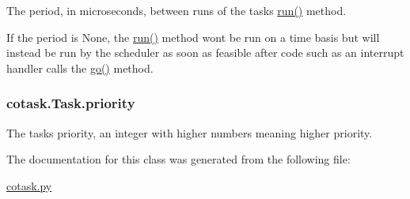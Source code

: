 The period, in microseconds, between runs of the task\textquotesingle{}s {\ttfamily \hyperlink{print__task_8py_abe2a60b9d48d38a4c9ec85bd891aafca}{run()}} method. 

If the period is {\ttfamily None}, the {\ttfamily \hyperlink{print__task_8py_abe2a60b9d48d38a4c9ec85bd891aafca}{run()}} method won\textquotesingle{}t be run on a time basis but will instead be run by the scheduler as soon as feasible after code such as an interrupt handler calls the {\ttfamily \hyperlink{classcotask_1_1Task_a78e74d18a5ba94074c2b5309394409a5}{go()}} method. 
\subsubsection[{\texorpdfstring{priority}{priority}}]{\setlength{\rightskip}{0pt plus 5cm}cotask.\+Task.\+priority}\hypertarget{classcotask_1_1Task_aeced93c7b7d23e33de9693d278aef88b}{}\label{classcotask_1_1Task_aeced93c7b7d23e33de9693d278aef88b}


The task\textquotesingle{}s priority, an integer with higher numbers meaning higher priority. 



The documentation for this class was generated from the following file\+:\begin{DoxyCompactItemize}
\item 
\hyperlink{cotask_8py}{cotask.\+py}\end{DoxyCompactItemize}
